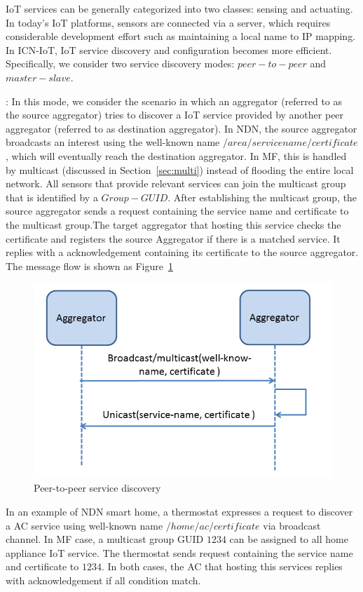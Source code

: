 IoT services can be generally categorized into two classes: sensing and actuating. In today's IoT platforms, sensors are connected via a server, which requires considerable development effort such as maintaining a local name to IP mapping. In ICN-IoT, IoT service discovery and configuration becomes more efficient. Specifically, we consider two service discovery modes: $peer-to-peer$ and $master-slave$.


\vspace{1mm}: In this mode, we consider the scenario in which an aggregator (referred to as the source aggregator) tries to discover a IoT service provided by another peer aggregator (referred to as destination aggregator). In NDN, the source aggregator broadcasts an interest using the well-known name $/area/servicename/certificate$, which will eventually reach the destination aggregator. In MF, this is handled by multicast (discussed in Section~\ref{sec:multi}) instead of flooding the entire local network. All sensors that provide relevant services can join the multicast group that is identified by a $Group-GUID$. After establishing the multicast group, the source aggregator sends a request containing the service name and certificate to the multicast group.The target aggregator that hosting this service checks the certificate and registers the source Aggregator if there is a matched service. It replies with a acknowledgement containing its certificate to the source aggregator. The message flow is shown as Figure~\ref{fig:ser_dis}
\begin{figure}
\includegraphics[width=\columnwidth]{figure/service_discovery.png}
\caption{\label{fig:ser_dis}Peer-to-peer service discovery}
\end{figure}
In an example of NDN smart home, a thermostat expresses a request to discover a AC service using well-known name $/home/ac/certificate$ via broadcast channel. In MF case, a multicast group GUID $1234$ can be assigned to all home appliance IoT service. The thermostat sends request containing the service name and certificate to $1234$. In both cases, the AC that hosting this services replies with acknowledgement if all condition match.

